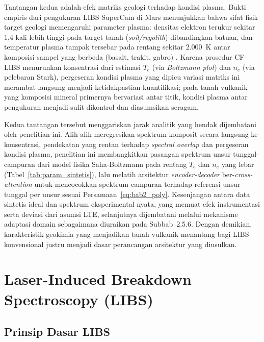 Tantangan kedua adalah efek matriks geologi terhadap kondisi plasma. Bukti empiris dari pengukuran LIBS SuperCam di Mars menunjukkan bahwa sifat fisik target geologi memengaruhi parameter plasma: densitas elektron terukur sekitar 1,4 kali lebih tinggi pada target tanah (\textit{soil/regolith}) dibandingkan batuan, dan temperatur plasma tampak tersebar pada rentang sekitar 2.000~K antar komposisi sampel yang berbeda (basalt, trakit, gabro) \citep{manelski_libs_2024}. Karena prosedur CF-LIBS menurunkan konsentrasi dari estimasi $T_e$ (via \textit{Boltzmann plot}) dan $n_e$ (via pelebaran Stark), pergeseran kondisi plasma yang dipicu variasi matriks ini merambat langsung menjadi ketidakpastian kuantifikasi; pada tanah vulkanik yang komposisi mineral primernya bervariasi antar titik, kondisi plasma antar pengukuran menjadi sulit dikontrol dan diasumsikan seragam.

Kedua tantangan tersebut menggariskan jarak analitik yang hendak dijembatani oleh penelitian ini. Alih-alih meregresikan spektrum komposit secara langsung ke konsentrasi, pendekatan yang rentan terhadap \textit{spectral overlap} dan pergeseran kondisi plasma, penelitian ini membangkitkan pasangan spektrum unsur tunggal-campuran dari model fisika Saha-Boltzmann pada rentang $T_e$ dan $n_e$ yang lebar (Tabel~\ref{tab:param_sintetis}), lalu melatih arsitektur \textit{encoder-decoder} ber-\textit{cross-attention} untuk mencocokkan spektrum campuran terhadap referensi unsur tunggal per unsur sesuai Persamaan~\ref{eq:bab2_poly}. Kesenjangan antara data sintetis ideal dan spektrum eksperimental nyata, yang memuat efek instrumentasi serta deviasi dari asumsi LTE, selanjutnya dijembatani melalui mekanisme adaptasi domain \citep{ganin_domain_2016} sebagaimana diuraikan pada Subbab~2.5.6. Dengan demikian, karakteristik geokimia yang menjadikan tanah vulkanik menantang bagi LIBS konvensional justru menjadi dasar perancangan arsitektur yang diusulkan.


\section{Laser-Induced Breakdown Spectroscopy (LIBS)}

\subsection{Prinsip Dasar LIBS}

